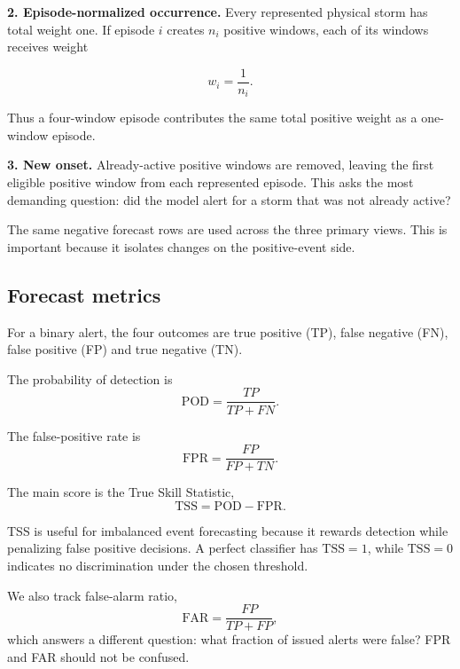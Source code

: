 \documentclass[11pt]{article}
\newcommand{\TSS}{\mathrm{TSS}}
\newcommand{\POD}{\mathrm{POD}}
\newcommand{\FPR}{\mathrm{FPR}}
\newcommand{\FAR}{\mathrm{FAR}}
\begin{document}
\textbf{2. Episode-normalized occurrence.} Every represented physical storm has total weight one. If episode $i$ creates $n_i$ positive windows, each of its windows receives weight

\begin{equation}
    w_i = \frac{1}{n_i}.
\end{equation}

Thus a four-window episode contributes the same total positive weight as a one-window episode.

\textbf{3. New onset.} Already-active positive windows are removed, leaving the first eligible positive window from each represented episode. This asks the most demanding question: did the model alert for a storm that was not already active?

The same negative forecast rows are used across the three primary views. This is important because it isolates changes on the positive-event side.

\subsection{Forecast metrics}

For a binary alert, the four outcomes are true positive (TP), false negative (FN), false positive (FP) and true negative (TN).

The probability of detection is
\begin{equation}
    \POD = \frac{TP}{TP+FN}.
\end{equation}

The false-positive rate is
\begin{equation}
    \FPR = \frac{FP}{FP+TN}.
\end{equation}

The main score is the True Skill Statistic,
\begin{equation}
    \TSS = \POD - \FPR.
\end{equation}

TSS is useful for imbalanced event forecasting because it rewards detection while penalizing false positive decisions. A perfect classifier has $\TSS=1$, while $\TSS=0$ indicates no discrimination under the chosen threshold.

We also track false-alarm ratio,
\begin{equation}
    \FAR = \frac{FP}{TP+FP},
\end{equation}
which answers a different question: what fraction of issued alerts were false? FPR and FAR should not be confused.
\end{document}
